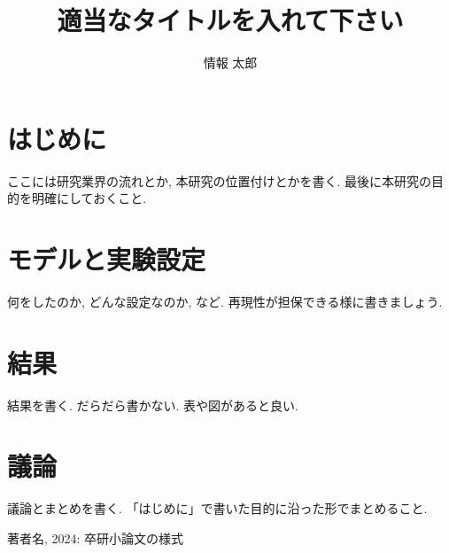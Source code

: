 \documentclass[a4j,twocolumn,uplatex,dvipdfmx]{jsarticle}
\title{適当なタイトルを入れて下さい}
\subtitle{}
\institute{情報メディア学科 佐々木 洋平ゼミ}
\author{情報 太郎}
\date{}
\begin{document}
\twocolumn[%
\maketitle
]
\section{はじめに}

ここには研究業界の流れとか, 本研究の位置付けとかを書く.
最後に本研究の目的を明確にしておくこと.

\section{モデルと実験設定}

何をしたのか, どんな設定なのか, など.
再現性が担保できる様に書きましょう.

\section{結果}

結果を書く. だらだら書かない.
表や図があると良い.

\section{議論}

議論とまとめを書く.
「はじめに」で書いた目的に沿った形でまとめること.

\begin{thebibliography}{9}
  著者名, 2024: 卒研小論文の様式

\end{thebibliography}

\end{document}
